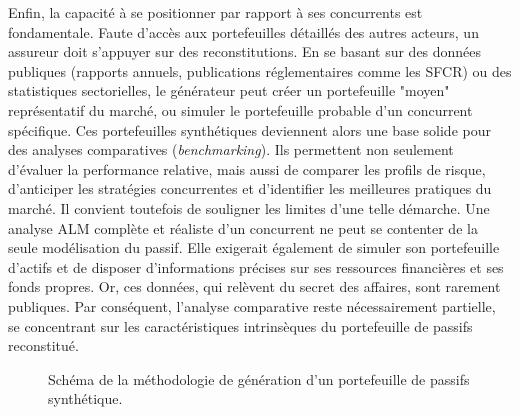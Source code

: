 Enfin, la capacité à se positionner par rapport à ses concurrents est fondamentale. Faute d'accès aux portefeuilles détaillés des autres acteurs, un assureur doit s'appuyer sur des reconstitutions. En se basant sur des données publiques (rapports annuels, publications réglementaires comme les SFCR) ou des statistiques sectorielles, le générateur peut créer un portefeuille "moyen" représentatif du marché, ou simuler le portefeuille probable d'un concurrent spécifique. Ces portefeuilles synthétiques deviennent alors une base solide pour des analyses comparatives (\textit{benchmarking}). Ils permettent non seulement d'évaluer la performance relative, mais aussi de comparer les profils de risque, d'anticiper les stratégies concurrentes et d'identifier les meilleures pratiques du marché. Il convient toutefois de souligner les limites d'une telle démarche. Une analyse ALM complète et réaliste d'un concurrent ne peut se contenter de la seule modélisation du passif. Elle exigerait également de simuler son portefeuille d'actifs et de disposer d'informations précises sur ses ressources financières et ses fonds propres. Or, ces données, qui relèvent du secret des affaires, sont rarement publiques. Par conséquent, l'analyse comparative reste nécessairement partielle, se concentrant sur les caractéristiques intrinsèques du portefeuille de passifs reconstitué.
\bigskip

\begin{figure}[h!]
    \centering
    \caption{Schéma de la méthodologie de génération d'un portefeuille de passifs synthétique.}
    \label{fig:methodologie_horizontale}
\end{figure}

